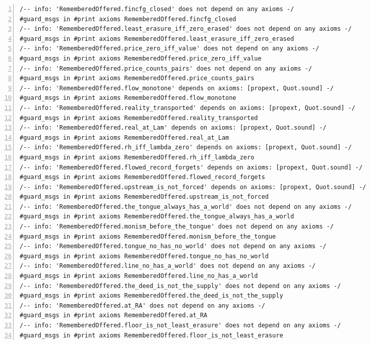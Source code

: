 \documentclass[10pt]{article}
\newcommand{\leansize}{\fontsize{5.5pt}{6.75pt}\selectfont}
\begin{document}
\begin{multicols}{2}
\begin{Verbatim}[numbers=left,firstnumber=1,numbersep=3pt,xleftmargin=2.6em,breaklines=true,breakanywhere=true,breakautoindent=false,breakindent=1.4em,breaksymbolleft={},breakanywheresymbolpre={},fontsize=\leansize]
/-- info: 'RememberedOffered.fincfg_closed' does not depend on any axioms -/
#guard_msgs in #print axioms RememberedOffered.fincfg_closed
/-- info: 'RememberedOffered.least_erasure_iff_zero_erased' does not depend on any axioms -/
#guard_msgs in #print axioms RememberedOffered.least_erasure_iff_zero_erased
/-- info: 'RememberedOffered.price_zero_iff_value' does not depend on any axioms -/
#guard_msgs in #print axioms RememberedOffered.price_zero_iff_value
/-- info: 'RememberedOffered.price_counts_pairs' does not depend on any axioms -/
#guard_msgs in #print axioms RememberedOffered.price_counts_pairs
/-- info: 'RememberedOffered.flow_monotone' depends on axioms: [propext, Quot.sound] -/
#guard_msgs in #print axioms RememberedOffered.flow_monotone
/-- info: 'RememberedOffered.reality_transported' depends on axioms: [propext, Quot.sound] -/
#guard_msgs in #print axioms RememberedOffered.reality_transported
/-- info: 'RememberedOffered.real_at_Lam' depends on axioms: [propext, Quot.sound] -/
#guard_msgs in #print axioms RememberedOffered.real_at_Lam
/-- info: 'RememberedOffered.rh_iff_lambda_zero' depends on axioms: [propext, Quot.sound] -/
#guard_msgs in #print axioms RememberedOffered.rh_iff_lambda_zero
/-- info: 'RememberedOffered.flowed_record_forgets' depends on axioms: [propext, Quot.sound] -/
#guard_msgs in #print axioms RememberedOffered.flowed_record_forgets
/-- info: 'RememberedOffered.upstream_is_not_forced' depends on axioms: [propext, Quot.sound] -/
#guard_msgs in #print axioms RememberedOffered.upstream_is_not_forced
/-- info: 'RememberedOffered.the_tongue_always_has_a_world' does not depend on any axioms -/
#guard_msgs in #print axioms RememberedOffered.the_tongue_always_has_a_world
/-- info: 'RememberedOffered.monism_before_the_tongue' does not depend on any axioms -/
#guard_msgs in #print axioms RememberedOffered.monism_before_the_tongue
/-- info: 'RememberedOffered.tongue_no_has_no_world' does not depend on any axioms -/
#guard_msgs in #print axioms RememberedOffered.tongue_no_has_no_world
/-- info: 'RememberedOffered.line_no_has_a_world' does not depend on any axioms -/
#guard_msgs in #print axioms RememberedOffered.line_no_has_a_world
/-- info: 'RememberedOffered.the_deed_is_not_the_supply' does not depend on any axioms -/
#guard_msgs in #print axioms RememberedOffered.the_deed_is_not_the_supply
/-- info: 'RememberedOffered.at_RA' does not depend on any axioms -/
#guard_msgs in #print axioms RememberedOffered.at_RA
/-- info: 'RememberedOffered.floor_is_not_least_erasure' does not depend on any axioms -/
#guard_msgs in #print axioms RememberedOffered.floor_is_not_least_erasure

\end{Verbatim}
\end{multicols}
\end{document}
